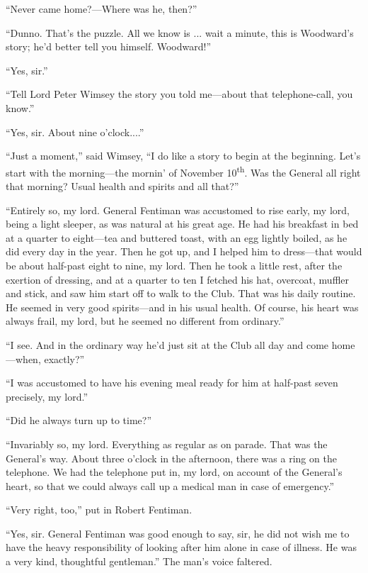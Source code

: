\enquote{Never came home?---Where was he, then?}

\enquote{Dunno. That's the puzzle. All we know is ... wait a minute, this is Woodward's story; he'd better tell you himself. Woodward!}

\enquote{Yes, sir.}

\enquote{Tell Lord Peter Wimsey the story you told me\allowbreak---\allowbreak about that telephone-call, you know.}

\enquote{Yes, sir. About nine o'clock....}

\enquote{Just a moment,} said Wimsey, \enquote{I do like a story to begin at the beginning. Let's start with the morning\allowbreak---\allowbreak the mornin' of November  10\textsuperscript{th}. Was the General all right that morning? Usual health and spirits and all that?}

\enquote{Entirely so, my lord. General Fentiman was accustomed to rise early, my lord, being a light sleeper, as was natural at his great age. He had his breakfast in bed at a quarter to eight\allowbreak---\allowbreak tea and buttered toast, with an egg lightly boiled, as he did every day in the year. Then he got up, and I helped him to dress\allowbreak---\allowbreak that would be about half-past eight to nine, my lord. Then he took a little rest, after the exertion of dressing, and at a quarter to ten I fetched his hat, overcoat, muffler and stick, and saw him start off to walk to the Club. That was his daily routine. He seemed in very good spirits\allowbreak---\allowbreak and in his usual health. Of course, his heart was always frail, my lord, but he seemed no different from ordinary.}

\enquote{I see. And in the ordinary way he'd just sit at the Club all day and come home\allowbreak---\allowbreak when, exactly?}

\enquote{I was accustomed to have his evening meal ready for him at half-past seven precisely, my lord.}

\enquote{Did he always turn up to time?}

\enquote{Invariably so, my lord. Everything as regular as on parade. That was the General's way. About three o'clock in the afternoon, there was a ring on the telephone. We had the telephone put in, my lord, on account of the General's heart, so that we could always call up a medical man in case of emergency.}

\enquote{Very right, too,} put in Robert Fentiman.

\enquote{Yes, sir. General Fentiman was good enough to say, sir, he did not wish me to have the heavy responsibility of looking after him alone in case of illness. He was a very kind, thoughtful gentleman.} The man's voice faltered.

